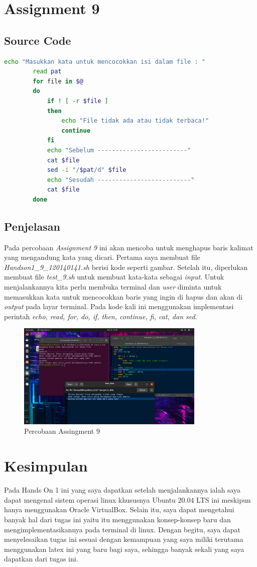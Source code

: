 \documentclass[11pt,a4paper]{article}
\begin{document}
\newpage
\section{Assignment 9}
\subsection*{Source Code}
\begin{lstlisting}[language=bash]
		echo "Masukkan kata untuk mencocokkan isi dalam file : "  
		read pat  
		for file in $@  
		do  
			if ! [ -r $file ]  
			then  
				echo "File tidak ada atau tidak terbaca!"  
				continue  
			fi  
			echo "Sebelum -------------------------"  
			cat $file  
			sed -i "/$pat/d" $file  
			echo "Sesudah --------------------------"  
			cat $file  
		done
\end{lstlisting}

\subsection*{Penjelasan}
	Pada percobaan \textit{Assignment 9} ini akan mencoba untuk menghapus baris kalimat yang mengandung kata yang dicari.
	Pertama saya membuat file \textit{Handson1\_9\_120140141.sh} berisi kode seperti gambar. Setelah itu, diperlukan membuat file \textit{test\_9.sh}
	untuk membuat kata-kata sebagai \textit{input}. Untuk menjalankannya kita perlu membuka terminal dan \textit{user} diminta untuk memasukkan 
	kata untuk mencocokkan baris yang ingin di hapus dan akan di \textit{output} pada layar terminal. Pada kode kali ini menggunakan 
	implementasi perintah \textit{echo, read, for, do, if, then, continue, fi, cat, dan sed}.
	\begin{figure}
		\centering
		\includegraphics[width=0.8\textwidth]{Figure/assign 9.png}
		\caption{Percobaan Assingment 9}
	\end{figure}

\newpage
\section{Kesimpulan}
	Pada Hands On 1 ini yang saya dapatkan setelah menjalankannya ialah saya dapat mengenal sistem operasi linux
	khususnya Ubuntu 20.04 LTS ini meskipun hanya menggunakan Oracle VirtualBox. Selain itu, saya dapat mengetahui
	banyak hal dari tugas ini yaitu itu menggunakan konsep-konsep baru dan mengimplementasikannya pada terminal di linux.
	Dengan begitu, saya dapat menyelesaikan tugas ini sesuai dengan kemampuan yang saya miliki terutama menggunakan latex
	ini yang baru bagi saya, sehingga banyak sekali yang saya dapatkan dari tugas ini.
		
\end{document}

